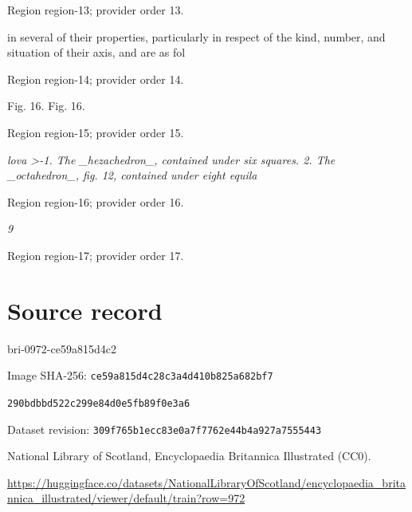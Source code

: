 \documentclass[11pt]{article}
\begin{document}
{\scriptsize\color{gray} Region region-13; provider order 13.\par}
\medskip

in several of their properties, particularly in respect of the kind, number, and situation of their axis, and are as fol
\par

{\scriptsize\color{gray} Region region-14; provider order 14.\par}
\medskip

Fig. 16. Fig. 16.
\par

{\scriptsize\color{gray} Region region-15; provider order 15.\par}
\medskip

{\small\itshape lova >-1. The \_hezachedron\_, contained under six squares. 2. The \_octahedron\_, fig. 12, contained under eight equila\par}

{\scriptsize\color{gray} Region region-16; provider order 16.\par}
\medskip

{\small\itshape 9\par}

{\scriptsize\color{gray} Region region-17; provider order 17.\par}
\medskip
\newpage\section*{Source record}
bri-0972-ce59a815d4c2\par
Image SHA-256: \texttt{ce59a815d4c28c3a4d410b825a682bf7}\par\texttt{290bdbbd522c299e84d0e5fb89f0e3a6}\par
Dataset revision: \texttt{309f765b1ecc83e0a7f7}\texttt{762e44b4a927a7555443}\par
National Library of Scotland, Encyclopaedia Britannica Illustrated (CC0).\par
\url{https://huggingface.co/datasets/NationalLibraryOfScotland/encyclopaedia_britannica_illustrated/viewer/default/train?row=972}
\end{document}
